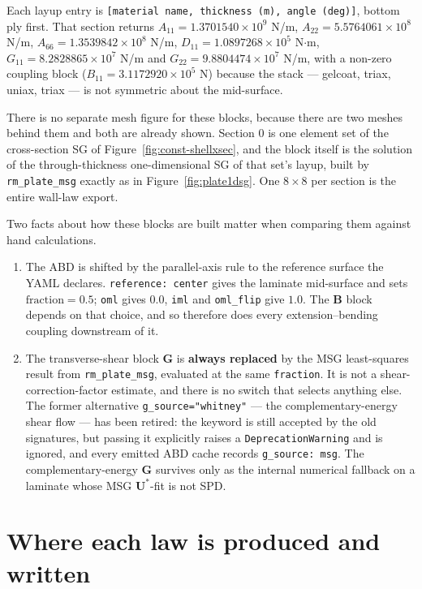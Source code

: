 Each layup entry is \texttt{[material name, thickness (m), angle (deg)]}, bottom
ply first. That section returns $A_{11} = 1.3701540\times10^{9}$ N/m,
$A_{22} = 5.5764061\times10^{8}$ N/m, $A_{66} = 1.3539842\times10^{8}$ N/m,
$D_{11} = 1.0897268\times10^{5}$ N$\cdot$m,
$G_{11} = 8.2828865\times10^{7}$ N/m and
$G_{22} = 9.8804474\times10^{7}$ N/m, with a non-zero coupling block
($B_{11} = 3.1172920\times10^{5}$ N) because the stack --- gelcoat, triax,
uniax, triax --- is not symmetric about the mid-surface.

There is no separate mesh figure for these blocks, because there are two meshes
behind them and both are already shown. Section 0 is one element set of the
cross-section SG of Figure~\ref{fig:const-shellxsec}, and the block itself is
the solution of the through-thickness one-dimensional SG of that set's layup,
built by \texttt{rm\_plate\_msg} exactly as in Figure~\ref{fig:plate1dsg}. One
$8\times8$ per section is the entire wall-law export.

Two facts about how these blocks are built matter when comparing them against
hand calculations.

\begin{enumerate}
\item The ABD is shifted by the parallel-axis rule to the reference surface the
  YAML declares. \texttt{reference: center} gives the laminate mid-surface and
  sets $\mathrm{fraction} = 0.5$; \texttt{oml} gives $0.0$, \texttt{iml} and
  \texttt{oml\_flip} give $1.0$. The $\mathbf B$ block depends on that choice,
  and so therefore does every extension--bending coupling downstream of it.
\item The transverse-shear block $\mathbf G$ is \textbf{always replaced} by the
  MSG least-squares result from \texttt{rm\_plate\_msg}, evaluated at the same
  \texttt{fraction}. It is not a shear-correction-factor estimate, and there is
  no switch that selects anything else. The former alternative
  \texttt{g\_source="whitney"} --- the complementary-energy shear flow --- has
  been retired: the keyword is still accepted by the old signatures, but
  passing it explicitly raises a \texttt{DeprecationWarning} and is ignored,
  and every emitted ABD cache records \texttt{g\_source: msg}. The
  complementary-energy $\mathbf G$ survives only as the internal numerical
  fallback on a laminate whose MSG $\mathbf U^*$-fit is not SPD.
\end{enumerate}

\section{Where each law is produced and written}
\label{sec:lawmap}

